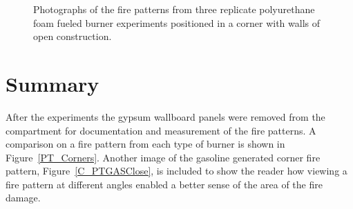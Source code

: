 \documentclass[twoside]{uocthesis}
\begin{document}
{\begin{figure}[p]
	\caption[Photographs of the fire patterns from three replicate polyurethane foam burner experiments positioned in a corner]{Photographs of the fire patterns from three replicate polyurethane foam fueled burner experiments positioned in a corner with walls of open construction.}
	\label{PUF_Corner}
\end{figure}

\section{Summary}

After the experiments the gypsum wallboard panels were removed from the compartment for documentation and measurement of the fire patterns.  A comparison on a fire pattern from each type of burner is shown in Figure~\ref{PT_Corners}.  Another image of the gasoline generated corner fire pattern, Figure~\ref{C_PTGASClose}, is included to show the reader how viewing a fire pattern at different angles enabled a better sense of the area of the fire damage. 

}
\end{document}
